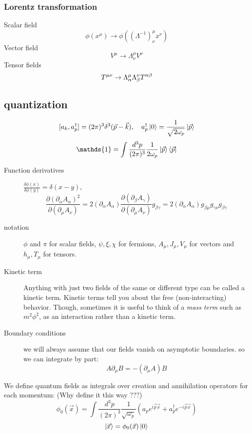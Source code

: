 \subsubsection{Lorentz transformation}
Scalar field
\[
    \phi(x^\mu)\rightarrow\phi((\Lambda^{-1})^\mu_\nu x^\nu)
    \]
Vector field
\[
    V^\mu\rightarrow\Lambda^\mu_\nu V^\nu
    \]
Tensor fields
\[
    T^{\mu\nu}\rightarrow\Lambda^\mu_\alpha\Lambda^\nu_\beta T^{\alpha\beta}
    \]
\subsection{quantization}
\[ [a_k, a_p^{\dag}] = (2\pi)^{3}\delta^{3}(\vec{p}-\vec{k}), \quad
a_p^{\dag}\ket{0} = \frac{1}{\sqrt{2\omega_p}}\ket{\vec{p}} \]
\[
    \mathds{1}=\int\frac{d^3p}{(2\pi)^3}\frac{1}{2\omega_p}\ket{\vec{p}}\bra{\vec{p}}
    \]

\begin{description}
    \item [Function derivatives]
	$\frac{\delta \phi(x)}{\delta \phi(y)} = \delta(x-y)$, 
	\[ 
	\frac{\partial(\partial_\alpha A_\alpha)^2}{\partial(\partial_{\mu}A_\nu)}
	=2(\partial_{\alpha}A_\alpha)\frac{\partial(\partial_{\beta}A_\gamma)}{\partial(\partial_{\mu}A_\nu)}g_{\beta\gamma}
	=2(\partial_{\alpha}A_\alpha)g_{\beta\mu}g_{\gamma\nu}g_{\beta\gamma}
	\]
    \item [notation] $\phi$ and $\pi$ for scalar fields, $\psi, \xi,
	\chi$ for fermions, $A_{\mu}, J_{\mu}, V_{\mu}$ for vectors and
	$h_{\mu},T_{\mu}$ for tensors.
    \item [Kinetic term] Anything with just two fields of the same or
	different type can be called a kinetic term. Kinetic terms tell you
	about the free (non-interacting) behavior. Though, sometimes it is useful to
	think of a \emph{mass term} such as $m^2\phi^2$, as an interaction
	rather than a kinetic term.
    \item [Boundary conditions] we will always assume that our fields vanish
	on asymptotic boundaries. so we can integrate by part:
	\emph{\[ A\partial_\mu B = -(\partial_\mu A) B\]}
\end{description}

We define quantum fields as integrals over creation and annihilation
operators for each momentum: (Why define it this way ???)
\begin{equation}
\phi_0(\vec{x}) = \int \frac{d^{3}p}{(2\pi)^3}
\frac{1}{\sqrt{\omega_p}}(a_pe^{i\vec{p}\vec{x}} + a_p^\dag
e^{-i\vec{p}\vec{x}})
    \label{eqn:free_field}
\end{equation}
\[ \ket{\vec{x}} = \phi_0(\vec{x}) \ket{0} \]


